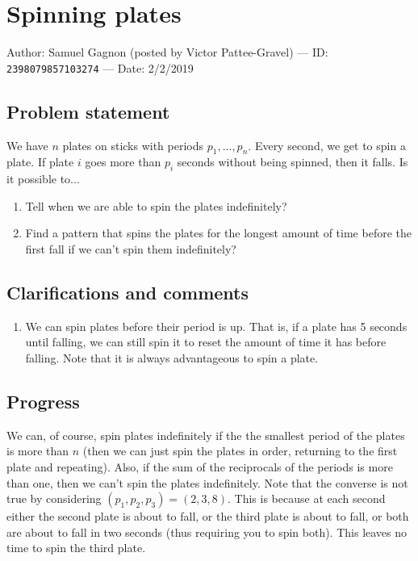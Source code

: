 
\section{Spinning plates}

Author: Samuel Gagnon (posted by Victor Pattee-Gravel) --- ID: \verb`2398079857103274` --- Date: 2/2/2019

\subsection{Problem statement}

We have $n$ plates on sticks with periods $p_1,\ldots,p_n$. Every second, we get to spin a plate. If plate $i$ goes more than $p_i$ seconds without being spinned, then it falls. Is it possible to...

\begin{enumerate}
  \item Tell when we are able to spin the plates indefinitely?
  \item Find a pattern that spins the plates for the longest amount of time before the first fall if we can't spin them indefinitely?
\end{enumerate}

\subsection{Clarifications and comments}

\begin{enumerate}
  \item We can spin plates before their period is up. That is, if a plate has 5 seconds until falling, we can still spin it to reset the amount of time it has before falling. Note that it is always advantageous to spin a plate.
\end{enumerate}

\subsection{Progress}

We can, of course, spin plates indefinitely if the the smallest period of the plates is more than $n$ (then we can just spin the plates in order, returning to the first plate and repeating). Also, if the sum of the reciprocals of the periods is more than one, then we can't spin the plates indefinitely. Note that the converse is not true by considering $(p_1,p_2,p_3)=(2,3,8)$. This is because at each second either the second plate is about to fall, or the third plate is about to fall, or both are about to fall in two seconds (thus requiring you to spin both). This leaves no time to spin the third plate.

